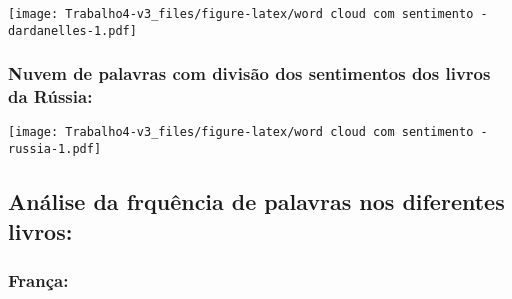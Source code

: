 \documentclass[]{article}
\newenvironment{Shaded}{\begin{snugshade}}{\end{snugshade}}
\newcommand{\DataTypeTok}[1]{\textcolor[rgb]{0.13,0.29,0.53}{#1}}
\newcommand{\DecValTok}[1]{\textcolor[rgb]{0.00,0.00,0.81}{#1}}
\newcommand{\KeywordTok}[1]{\textcolor[rgb]{0.13,0.29,0.53}{\textbf{#1}}}
\newcommand{\NormalTok}[1]{#1}
\newcommand{\OperatorTok}[1]{\textcolor[rgb]{0.81,0.36,0.00}{\textbf{#1}}}
\newcommand{\OtherTok}[1]{\textcolor[rgb]{0.56,0.35,0.01}{#1}}
\newcommand{\StringTok}[1]{\textcolor[rgb]{0.31,0.60,0.02}{#1}}
\begin{document}
\texttt{[image: Trabalho4-v3\_files/figure-latex/word cloud com sentimento - dardanelles-1.pdf]}

\hypertarget{nuvem-de-palavras-com-divisao-dos-sentimentos-dos-livros-da-russia}{%
\subsubsection{Nuvem de palavras com divisão dos sentimentos dos livros
da
Rússia:}\label{nuvem-de-palavras-com-divisao-dos-sentimentos-dos-livros-da-russia}}

\begin{Shaded}
\end{Shaded}

\texttt{[image: Trabalho4-v3\_files/figure-latex/word cloud com sentimento - russia-1.pdf]}

\hypertarget{analise-da-frquencia-de-palavras-nos-diferentes-livros}{%
\subsection{Análise da frquência de palavras nos diferentes
livros:}\label{analise-da-frquencia-de-palavras-nos-diferentes-livros}}

\hypertarget{franca}{%
\subsubsection{França:}\label{franca}}
\end{document}
